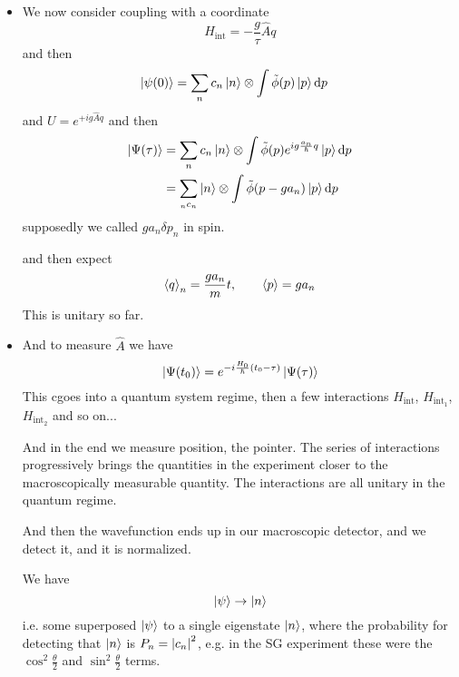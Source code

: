\documentclass[11pt, a4paper]{article}
\newcommand{\diff}{\mathop{}\!\mathrm{d}} %
\begin{document}
\begin{itemize}
    \item We now consider coupling with a coordinate
    \begin{equation*}
        H_{\text{int}} = - \frac{g}{\tau}\hat{A} q
    \end{equation*}
    and then
    \begin{align*}
        \ket{\psi(0)} &= \sum_{n}c_{n}\ket{n} \otimes \int \tilde{\phi}(p)\ket{p}\diff p
    \end{align*}
    and $ U = e^{+ig \hat{A}q} $ and then
    \begin{align*}
        \ket{\Psi(\tau)} & = \sum_{n}c_{n}\ket{n} \otimes \int \tilde{\phi}(p)e^{ig \frac{a_{n}}{\hbar}q} \ket{p} \diff p \\
        & = \sum_{_{n}c_{n}}\ket{n} \otimes \int \tilde{\phi}(p - ga_{n})\ket{p} \diff p
    \end{align*}
    supposedly we called $ ga_{n} \delta p_{n} $ in spin.

    and then expect
    \begin{equation*}
        \ev{q}_{n} = \frac{g a_{n}}{m}t, \qquad  \ev{p} = ga_{n}
    \end{equation*}
    This is unitary so far.
    
    \item And to measure $ \hat{A} $ we have
    \begin{equation*}
        \ket{\Psi(t_{0})} = e^{-i \frac{H_{0}}{\hbar}(t_{0} - \tau)}\ket{\Psi(\tau)}
    \end{equation*}
    This cgoes into a quantum system regime, then a few interactions $ H_{\text{int}} $, $ H_{\text{int}_{1}} $, $ H_{\text{int}_{2}} $ and so on...

    And in the end we measure position, the pointer. The series of interactions progressively brings the quantities in the experiment closer to the macroscopically measurable quantity. The interactions are all unitary in the quantum regime. 

    And then the wavefunction ends up in our macroscopic detector, and we detect it, and it is normalized. 

    We have 
    \begin{equation*}
        \ket{\psi} \to \ket{n}
    \end{equation*}
    i.e. some superposed $ \ket{\psi} $ to a single eigenstate $ \ket{n} $, where the probability for detecting that $ \ket{n} $ is $ P_{n} = \abs{c_{n}}^{2} $, e.g. in the SG experiment these were the $ \cos^{2}\frac{\theta}{2} $ and $ \sin^{2}\frac{\theta}{2} $ terms. 
    
    
\end{itemize}
\end{document}
